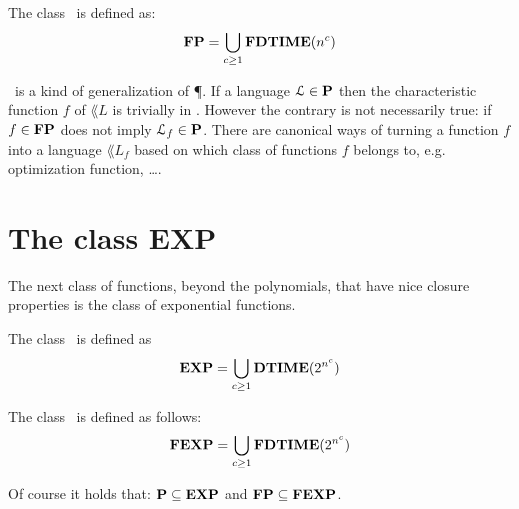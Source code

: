 \begin{definition}[\FP~class]
	The class \FP~is defined as:
	\begin{equation}
		\textbf{FP} = \bigcup_{c \geq 1} \textbf{FDTIME}(n^c)
		\label{eq:FP-class}
	\end{equation}
	\label{def:FP-class}
\end{definition}
\begin{remark}
	\FP~is a kind of generalization of \P.
	If a language \(\mathcal{L} \in \textbf{P} \) then the characteristic function $f$ of $\lang{L}$ is trivially in \FP.
	However the contrary is not necessarily true: if \(f \in \textbf{FP}\) does not imply \(\mathcal{L}_f \in \textbf{P} \).
	There are canonical ways of turning a function $f$ into a language $\lang{L}_f$ based on which class of functions $f$ belongs to, e.g. optimization function, \ldots.
\end{remark}


\section{The class EXP}

The next class of functions, beyond the polynomials, that have nice closure properties is the class of exponential functions.
\begin{definition}
	The class \EXP~is defined as
	\begin{equation}
		\textbf{EXP} = \bigcup_{c \geq 1} \textbf{DTIME}(2^{n^c})
		\label{eq:class-EXP}
	\end{equation}
	\label{def:class-EXP}
\end{definition}
\begin{definition}
	The class \FEXP~is defined as follows:
	\begin{equation}
		\textbf{FEXP} = \bigcup_{c \geq 1} \textbf{FDTIME}(2^{n^c})
		\label{eq:class-FEXP}
	\end{equation}
	\label{def:class-FEXP}
\end{definition}
Of course it holds that: \(\textbf{P} \subseteq \textbf{EXP}\) and \(\textbf{FP} \subseteq \textbf{FEXP}\).



